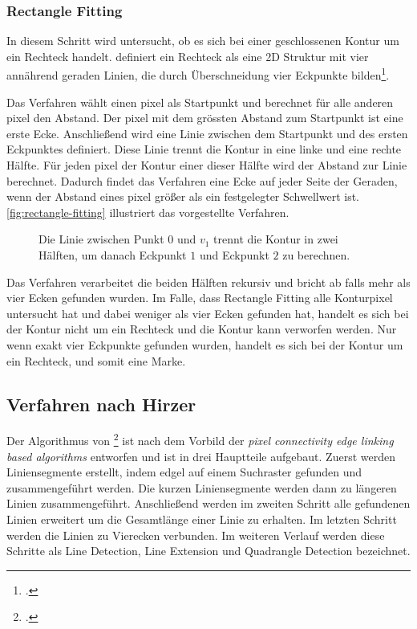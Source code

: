 
\subsubsection{Rectangle Fitting} %
\label{sub:rectangle_fitting}

In diesem Schritt wird untersucht, ob es sich bei einer geschlossenen Kontur um ein Rechteck handelt.
 \citeauthor{wagner07a} definiert ein Rechteck als eine 2D Struktur mit vier annährend geraden Linien, die durch
 Überschneidung vier Eckpunkte bilden\footcite[Vgl.][S.~42]{wagner07a}.

Das Verfahren wählt einen \gls{pixel} als Startpunkt und berechnet für alle anderen \gls{pixel} den Abstand. Der
 \gls{pixel} mit dem grössten Abstand zum Startpunkt ist eine erste Ecke. Anschließend wird eine Linie zwischen dem
 Startpunkt und des ersten Eckpunktes definiert. Diese Linie trennt die Kontur in eine linke und eine rechte Hälfte.
 Für jeden \gls{pixel} der Kontur einer dieser Hälfte wird der Abstand zur Linie berechnet. Dadurch findet das
 Verfahren eine Ecke auf jeder Seite der Geraden, wenn der Abstand eines \gls{pixel} größer als ein festgelegter
 Schwellwert ist. \autoref{fig:rectangle-fitting} illustriert das vorgestellte Verfahren.
\begin{figure}[!ht]
	\centering
	
	\caption{Die Linie zwischen Punkt $0$ und $v_{1}$ trennt die Kontur in zwei Hälften, um danach Eckpunkt $1$ und
	 Eckpunkt $2$ zu berechnen.}
	\label{fig:rectangle-fitting}
\end{figure}
Das Verfahren verarbeitet die beiden Hälften rekursiv und bricht ab falls mehr als vier Ecken gefunden wurden. Im Falle,
 dass Rectangle Fitting alle Konturpixel untersucht hat und dabei weniger als vier Ecken gefunden hat, handelt es sich
 bei der Kontur nicht um ein Rechteck und die Kontur kann verworfen werden. Nur wenn exakt vier Eckpunkte gefunden
 wurden, handelt es sich bei der Kontur um ein Rechteck, und somit eine Marke.



\subsection{Verfahren nach Hirzer} %
\label{sub:verfahren_nach_hirzer}

Der Algorithmus von \citeauthor{hirzer08}\footcite{hirzer08} ist nach dem Vorbild der \textit{pixel connectivity edge
 linking based algorithms} entworfen und ist in drei Hauptteile aufgebaut. Zuerst werden Liniensegmente erstellt,
 indem \gls{edgel} auf einem Suchraster gefunden und zusammengeführt werden. Die kurzen Liniensegmente werden dann zu
 längeren Linien zusammengeführt. Anschließend werden im zweiten Schritt alle gefundenen Linien erweitert um die
 Gesamtlänge einer Linie zu erhalten. Im letzten Schritt werden die Linien zu Vierecken verbunden. Im weiteren Verlauf
 werden diese Schritte als Line Detection, Line Extension und Quadrangle Detection bezeichnet.

